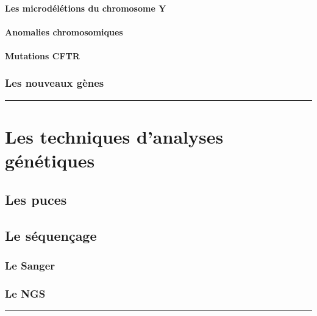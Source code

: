 \documentclass[12pt,twoside]{reedthesis}
\theoremstyle{definition}
\theoremstyle{definition}
\theoremstyle{remark}
\begin{document}
  \paragraph{Les microdélétions du chromosome
  Y}\label{les-microdeletions-du-chromosome-y}
  
  \paragraph{Anomalies chromosomiques}\label{anomalies-chromosomiques}
  
  \paragraph{Mutations CFTR}\label{mutations-cftr}
  
  \subsubsection{Les nouveaux gènes}\label{les-nouveaux-genes}
  
  \begin{center}\rule{0.5\linewidth}{\linethickness}\end{center}
  
  \section{Les techniques d'analyses
  génétiques}\label{les-techniques-danalyses-genetiques}
  
  \subsection{Les puces}\label{les-puces}
  
  \subsection{Le séquençage}\label{le-sequencage}
  
  \subsubsection{Le Sanger}\label{le-sanger}
  
  \subsubsection{Le NGS}\label{le-ngs}
  
  \begin{center}\rule{0.5\linewidth}{\linethickness}\end{center}
  
\end{document}
